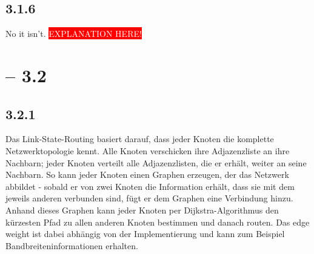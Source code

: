\documentclass[a4paper,
			llpt,
			solution,
			accentcolor=tud2d,
			colorbacktitle
			]
			{tudexercise}
\newcommand{\8}{$\infty$}
\begin{document}
\subsection{3.1.6}
No it isn't. \colorbox{red}{\textcolor{white}{EXPLANATION HERE!}}
\clearpage
\section{ -- 3.2}
\subsection{3.2.1}
Das Link-State-Routing basiert darauf, dass jeder Knoten die komplette Netzwerktopologie kennt. Alle Knoten verschicken ihre Adjazenzliste an ihre Nachbarn; jeder Knoten verteilt alle Adjazenzlisten, die er erhält, weiter an seine Nachbarn. So kann jeder Knoten einen Graphen erzeugen, der das Netzwerk abbildet - sobald er von zwei Knoten die Information erhält, dass sie mit dem jeweils anderen verbunden sind, fügt er dem Graphen eine Verbindung hinzu. Anhand dieses Graphen kann jeder Knoten per Dijkstra-Algorithmus den kürzesten Pfad zu allen anderen Knoten bestimmen und danach routen. Das edge weight ist dabei abhängig von der Implementierung und kann zum Beispiel Bandbreiteninformationen erhalten. 
\end{document}
